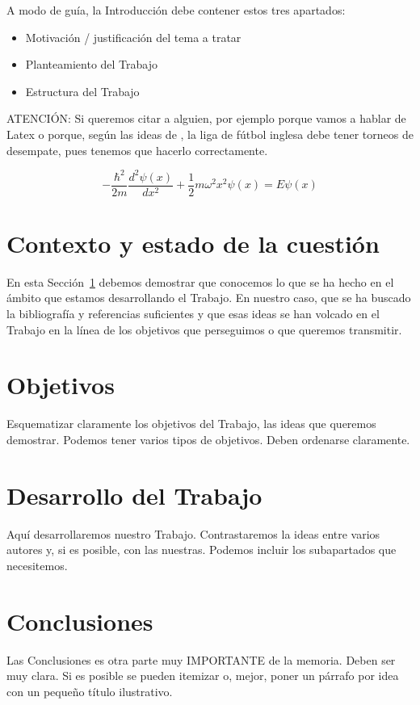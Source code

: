 \documentclass[11pt,a4paper,spanish]{book}
\begin{document}
A modo de guía, la Introducción debe contener estos tres apartados:
\begin{itemize}
\item Motivación / justificación del tema a tratar
\item Planteamiento del Trabajo
\item Estructura del Trabajo
\end{itemize}


ATENCIÓN:  Si queremos citar a alguien, por ejemplo porque vamos a hablar de Latex \citep{lamport1994} o porque, según las ideas de \cite{ackerman2017}, la liga de fútbol inglesa debe tener torneos de desempate, pues tenemos que hacerlo correctamente.

\[
-\frac{\hbar^2}{2m} \frac{d^2\psi(x)}{dx^2} + \frac{1}{2}m\omega^2x^2\psi(x) = E\psi(x)
\]


\chapter{Contexto y estado de la cuestión}\label{contexto}

En esta Sección~\ref{contexto} debemos demostrar que conocemos lo que se ha hecho en el ámbito que estamos desarrollando el Trabajo. En nuestro caso, que se ha buscado la bibliografía y referencias suficientes y que esas ideas se han volcado en el Trabajo en la línea de los objetivos que perseguimos o que queremos transmitir.


\chapter{Objetivos}

Esquematizar claramente los objetivos del Trabajo, las ideas que queremos demostrar. Podemos tener varios tipos de objetivos. Deben ordenarse claramente.

\chapter{Desarrollo del Trabajo}

Aquí desarrollaremos nuestro Trabajo. Contrastaremos la ideas entre varios autores y, si es posible, con las nuestras. Podemos incluir los subapartados que necesitemos.

\chapter{Conclusiones}

Las Conclusiones es otra parte muy IMPORTANTE de la memoria. Deben ser muy clara. Si es posible se pueden itemizar o, mejor, poner un párrafo por idea con un pequeño título ilustrativo.
\end{document}
